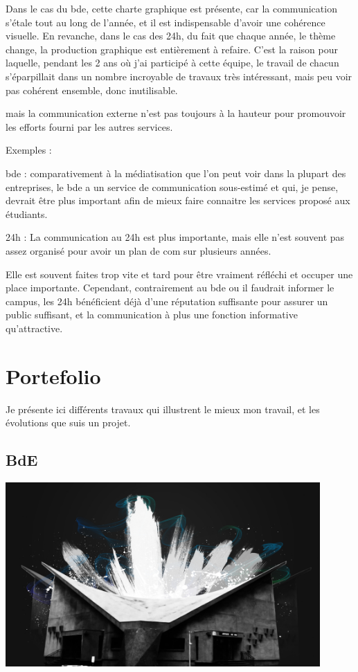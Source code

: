     Dans le cas du bde, cette charte graphique est présente, car la communication s'étale tout au long de l'année, et il est indispensable d'avoir une cohérence visuelle.
    En revanche, dans le cas des 24h, du fait que chaque année, le thème change, la production graphique est entièrement à refaire.
    C'est la raison pour laquelle, pendant les 2 ans où j'ai participé à cette équipe, le travail de chacun s'éparpillait dans un nombre incroyable de travaux très intéressant, mais peu voir pas cohérent ensemble, donc inutilisable.



     mais la communication externe n'est pas toujours à la hauteur pour promouvoir les efforts fourni par les autres services.

    Exemples :

        bde : comparativement à la médiatisation que l'on peut voir dans la plupart des entreprises, le bde a un service de communication sous-estimé et qui, je pense, devrait être plus important afin de mieux faire connaitre les services proposé aux étudiants.

        24h : La communication au 24h est plus importante, mais elle n'est souvent pas assez organisé pour avoir un plan de com sur plusieurs années.
        
    Elle est souvent faites trop vite et tard pour être vraiment réfléchi et occuper une place importante.
    Cependant, contrairement au bde ou il faudrait informer le campus, les 24h bénéficient déjà d'une réputation suffisante pour assurer un public suffisant, et la communication à plus une fonction informative qu'attractive.




\section{Portefolio}

    Je présente ici différents travaux qui illustrent le mieux mon travail, et les évolutions que suis un projet.
    \subsection{BdE}
        \includegraphics[width=0.9\textwidth]{img/amphi.jpg}
        
